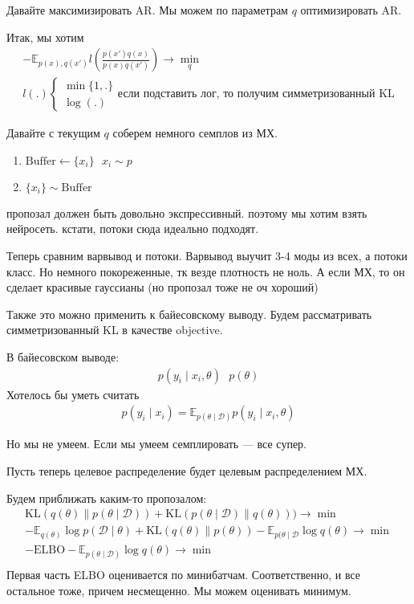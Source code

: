 \documentclass{minimal}
\begin{document}
Давайте максимизировать AR. Мы можем по параметрам $q$ оптимизировать AR.

Итак, мы хотим
\begin{gather*}
    -\mathbb{E}_{p(x),q(x')}l(\frac{p(x')q(x)}{p(x)q(x')}) \rightarrow \min_q\\
    l(.) \begin{cases} \min \{1, .\}\\ \log(.)\end{cases} \textrm{если подставить лог, то получим симметризованный KL}
\end{gather*}

Давайте с текущим $q$ соберем немного семплов из МХ.

\begin{enumerate}
    \item $\mathrm{Buffer} \leftarrow \{x_i\}~~~x_i\sim p$
    \item $\{x_i\} \sim \mathrm{Buffer}$
\end{enumerate}

пропозал должен быть довольно экспрессивный. поэтому мы хотим взять нейросеть. кстати, потоки сюда идеально подходят.

Теперь сравним варвывод и потоки. Варвывод выучит 3-4 моды из всех, а потоки класс. Но немного покореженные, тк везде плотность не ноль.
А если МХ, то он сделает красивые гауссианы (но пропозал тоже не оч хороший)

Также это можно применить к байесовскому выводу.
Будем рассматривать симметризованный KL в качестве objective.

В байесовском выводе:
\begin{gather*}
    p(y_i\mid x_i, \theta)~~~ p(\theta)
\end{gather*}
Хотелось бы уметь считать
\begin{gather*}
    p(y_i\mid x_i)=\mathbb{E}_{p(\theta\mid \mathcal{D})} p(y_i\mid x_i,\theta)
\end{gather*}

Но мы не умеем. Если мы умеем семплировать --- все супер.

Пусть теперь целевое распределение будет целевым распределением МХ.

Будем приближать каким-то пропозалом:
\begin{gather*}
    \mathrm{KL}(q(\theta)\|p(\theta\mid \mathcal{D}))+\mathrm{KL}(p(\theta\mid \mathcal{D})\|q(\theta))) \rightarrow \min\\
    -\mathbb{E}_{q(\theta)}\log p(\mathcal{D}\mid \theta)+\mathrm{KL}(q(\theta)\|p(\theta))-\mathbb{E}_{p(\theta\mid \mathcal{D}}\log q(\theta)\rightarrow\min\\
    -\mathrm{ELBO}-\mathbb{E}_{p(\theta\mid \mathcal{D})}\log q(\theta)\rightarrow\min\\
\end{gather*}
Первая часть ELBO оценивается по минибатчам. Соответственно, и все остальное тоже, причем несмещенно. Мы можем оценивать минимум.
\end{document}

